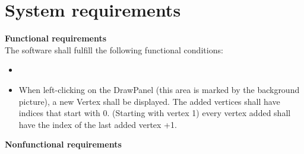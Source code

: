 \documentclass{article}
\begin{document}
\section{System requirements}
\textbf{Functional requirements} \\
The software shall fulfill the following functional conditions:
\begin{itemize}
\item \item When left-clicking on the DrawPanel (this area is marked by the background picture), a new Vertex shall be displayed. The added vertices shall have indices that start with 0. (Starting with vertex 1) every vertex added shall have the index of the last added vertex +1.
\end{itemize}  


\textbf{Nonfunctional requirements}
\end{document}

